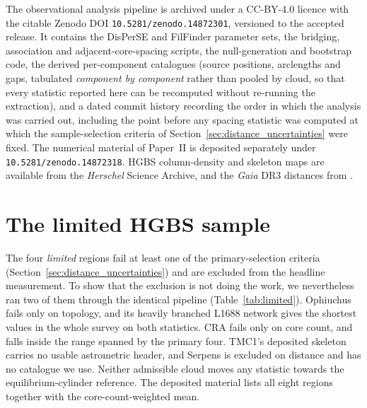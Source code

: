 \documentclass[usenatbib,twoside,twocolumn]{mnras}
\begin{document}
The observational analysis pipeline is archived under a CC-BY-4.0 licence with the citable Zenodo DOI \texttt{10.5281/zenodo.14872301}, versioned to the accepted release. It contains the DisPerSE and FilFinder parameter sets, the bridging, association and adjacent-core-spacing scripts, the null-generation and bootstrap code, the derived per-component catalogues (source positions, arclengths and gaps, tabulated \emph{component by component} rather than pooled by cloud, so that every statistic reported here can be recomputed without re-running the extraction), and a dated commit history recording the order in which the analysis was carried out, including the point before any spacing statistic was computed at which the sample-selection criteria of Section~\ref{sec:distance_uncertainties} were fixed. The numerical material of Paper~II is deposited separately under \texttt{10.5281/zenodo.14872318}. HGBS column-density and skeleton maps are available from the \textit{Herschel} Science Archive, and the \textit{Gaia} DR3 distances from \citet{Zhang2023}.

\nocite{PaperII}


\appendix

\section{The limited HGBS sample}
\label{sec:limited_sample}
The four \emph{limited} regions fail at least one of the primary-selection criteria (Section~\ref{sec:distance_uncertainties}) and are excluded from the headline measurement. To show that the exclusion is not doing the work, we nevertheless ran two of them through the identical pipeline (Table~\ref{tab:limited}). Ophiuchus fails only on topology, and its heavily branched L1688 network gives the shortest values in the whole survey on both statistics. CRA fails only on core count, and falls inside the range spanned by the primary four. TMC1's deposited skeleton carries no usable astrometric header, and Serpens is excluded on distance and has no catalogue we use. Neither admissible cloud moves any statistic towards the equilibrium-cylinder reference. The deposited material lists all eight regions together with the core-count-weighted mean.
\end{document}
